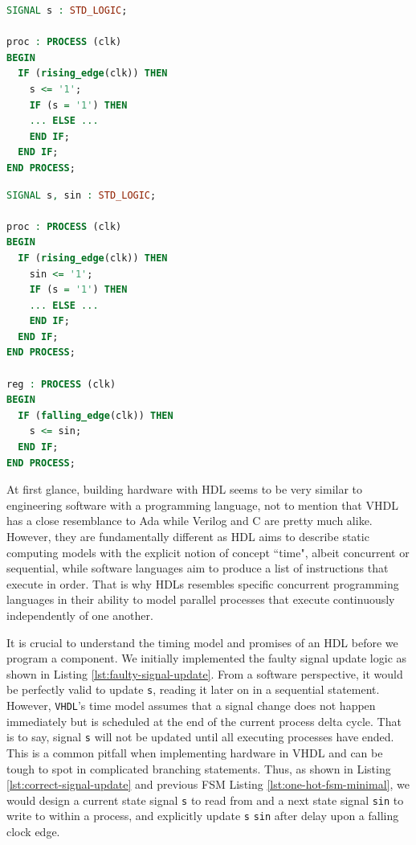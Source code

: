 \documentclass[a4paper]{report}
\newcommand{\proglang}{\textsf}
\newcommand{\code}{\texttt}
\begin{document}
\begin{minipage}{.45\textwidth}
\begin{lstlisting}[language=VHDL, caption=Faulty Signal Update in \proglang{VHDL}, label={lst:faulty-signal-update}]
SIGNAL s : STD_LOGIC;

proc : PROCESS (clk)
BEGIN
  IF (rising_edge(clk)) THEN
    s <= '1';
    IF (s = '1') THEN
    ... ELSE ...
    END IF;
  END IF;
END PROCESS;
\end{lstlisting}
\end{minipage}\hfill
\begin{minipage}{.45\textwidth}
\begin{lstlisting}[language=VHDL, caption=Correct Signal Update in \proglang{VHDL}, label={lst:correct-signal-update}]
SIGNAL s, sin : STD_LOGIC;

proc : PROCESS (clk)
BEGIN
  IF (rising_edge(clk)) THEN
    sin <= '1';
    IF (s = '1') THEN
    ... ELSE ...
    END IF;
  END IF;
END PROCESS;

reg : PROCESS (clk)
BEGIN
  IF (falling_edge(clk)) THEN
    s <= sin;
  END IF;
END PROCESS;
\end{lstlisting}
\end{minipage}

At first glance, building hardware with HDL seems to be very similar to engineering software with a programming language, not to mention that \proglang{VHDL} has a close resemblance to \proglang{Ada} while \proglang{Verilog} and \proglang{C} are pretty much alike. However, they are fundamentally different as HDL aims to describe static computing models with the explicit notion of concept ``time", albeit concurrent or sequential, while software languages aim to produce a list of instructions that execute in order. That is why HDLs resembles specific concurrent programming languages in their ability to model parallel processes that execute continuously independently of one another.

It is crucial to understand the timing model and promises of an HDL before we program a component. We initially implemented the faulty signal update logic as shown in Listing \ref{lst:faulty-signal-update}. From a software perspective, it would be perfectly valid to update \code{s}, reading it later on in a sequential statement. However, \code{VHDL}'s time model assumes that a signal change does not happen immediately but is scheduled at the end of the current process delta cycle. That is to say, signal \code{s} will not be updated until all executing processes have ended. This is a common pitfall when implementing hardware in \proglang{VHDL} and can be tough to spot in complicated branching statements. Thus, as shown in Listing \ref{lst:correct-signal-update} and previous FSM Listing \ref{lst:one-hot-fsm-minimal}, we would design a current state signal \code{s} to read from and a next state signal \code{sin} to write to within a process, and explicitly update \code{s} \textleftarrow \code{sin} after delay upon a falling clock edge. 
\end{document}
